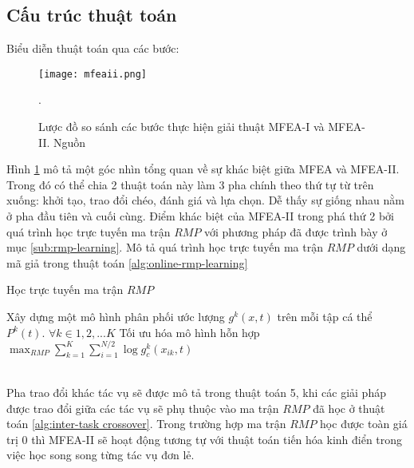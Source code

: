 \subsection{Cấu trúc thuật toán}
    Biểu diễn thuật toán qua các bước:
    \begin{figure}[ht]
        \centering
        \texttt{[image: mfeaii.png]}
        \caption{Lược đồ so sánh các bước thực hiện giải thuật MFEA-I và MFEA-II. Nguồn \cite{bali2019multifactorial}}.
        \label{fig:mfeaii}
    \end{figure}
    Hình \ref{fig:mfeaii} mô tả một góc nhìn tổng quan về sự khác biệt giữa MFEA và MFEA-II. Trong đó có thể chia 2 thuật toán này làm 3 pha chính theo thứ tự từ trên xuống: khởi tạo, trao đổi chéo, đánh giá và lựa chọn. Dễ thấy sự giống nhau nằm ở pha đầu tiên và cuối cùng. Điểm khác biệt của MFEA-II trong phá thứ 2 bởi quá trình học trực tuyến ma trận $RMP$ với phương pháp đã được trình bày ở mục \ref{sub:rmp-learning}. Mô tả quá trình học trực tuyến ma trận $RMP$ dưới dạng mã giả trong thuật toán \ref{alg:online-rmp-learning}
    \begin{algorithm}[ht]
        \caption{Học trực tuyến ma trận $RMP$}
        \begin{algorithmic}[1]
            \State Xây dựng một mô hình phân phối ước lượng $g^k(x,t)$ trên mỗi tập cá thể $P^k(t)$. $\forall k \in {1,2,...K}$
            \State Tối ưu hóa mô hình hỗn hợp $\max_{RMP}\sum_{k=1}^{K}\sum_{i=1}^{N/2}\log{g_c^k(x_{ik},t)}$
        \end{algorithmic}
        \label{alg:online-rmp-learning}
    \end{algorithm} \\
    Pha trao đổi khác tác vụ sẽ được mô tả trong thuật toán 5, khi các giải pháp được trao đổi giữa các tác vụ sẽ phụ thuộc vào ma trận $RMP$ đã học ở thuật toán \ref{alg:inter-task crossover}. Trong trường hợp ma trận $RMP$ học được toàn giá trị $0$ thì MFEA-II sẽ hoạt động tương tự với thuật toán tiến hóa kinh điển trong việc học song song từng tác vụ đơn lẻ. \\ 
